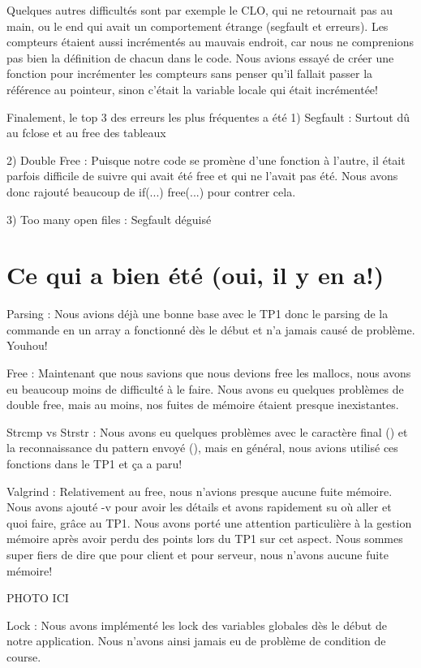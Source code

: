 \documentclass[11pt]{article}
\begin{document}
Quelques autres difficultés sont par exemple le CLO, qui ne retournait pas au main, ou le end qui avait un comportement étrange (segfault et erreurs). Les compteurs étaient aussi incrémentés au mauvais endroit, car nous ne comprenions pas bien la définition de chacun dans le code. Nous avions essayé de créer une fonction pour incrémenter les compteurs sans penser qu’il fallait passer la référence au pointeur, sinon c’était la variable locale qui était incrémentée!

Finalement, le top 3 des erreurs les plus fréquentes a été
1) Segfault : Surtout dû au fclose et au free des tableaux

2) Double Free : Puisque notre code se promène d’une fonction à l’autre, il était parfois difficile de suivre qui avait été free et qui ne l’avait pas été. Nous avons donc rajouté beaucoup de if(...) free(...) pour contrer cela.

3) Too many open files : Segfault déguisé


\section{Ce qui a bien été (oui, il y en a!)}

Parsing : Nous avions déjà une bonne base avec le TP1 donc le parsing de la commande en un array a fonctionné dès le début et n’a jamais causé de problème. Youhou!

Free : Maintenant que nous savions que nous devions free les mallocs, nous avons eu beaucoup moins de difficulté à le faire. Nous avons eu quelques problèmes de double free, mais au moins, nos fuites de mémoire étaient presque inexistantes.

Strcmp vs Strstr : Nous avons eu quelques problèmes avec le caractère final (\0) et la reconnaissance du pattern envoyé (\n), mais en général, nous avions utilisé ces fonctions dans le TP1 et ça a paru!

Valgrind : Relativement au free, nous n’avions presque aucune fuite mémoire. Nous avons ajouté -v pour avoir les détails et avons rapidement su où aller et quoi faire, grâce au TP1. Nous avons porté une attention particulière à la gestion mémoire après avoir perdu des points lors du TP1 sur cet aspect. Nous sommes super fiers de dire que pour client et pour serveur, nous n’avons aucune fuite mémoire! 

PHOTO ICI

Lock : Nous avons implémenté les lock des variables globales dès le début de notre application. Nous n’avons ainsi jamais eu de problème de condition de course.
\end{document}
